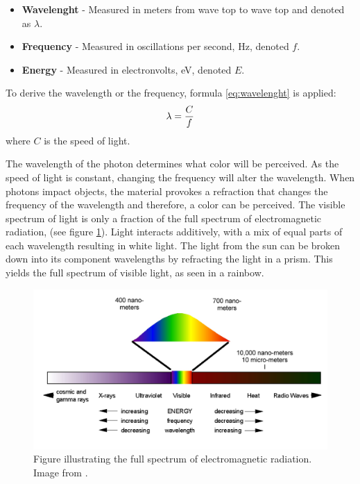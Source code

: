 \begin{itemize}
\item \textbf{Wavelenght} - Measured in meters from wave top to wave top and denoted as $\lambda$.
\item \textbf{Frequency} - Measured in oscillations per second, Hz, denoted $f$.
\item \textbf{Energy} - Measured in electronvolts, eV, denoted $E$.
\end{itemize}

To derive the wavelength or the frequency, formula \ref{eq:wavelenght} is applied:
\begin{align}
\centering 
\lambda = \frac{C}{f}
\label{eq:wavelenght} 
\end{align}
where {$C$} is the speed of light.

The wavelength of the photon determines what color will be perceived. As the speed of light is constant, changing the frequency will alter the wavelength. When photons impact objects, the material provokes a refraction that changes the frequency of the wavelength and therefore, a color can be perceived. The visible spectrum of light is only a fraction of the full spectrum of electromagnetic radiation, (see figure \ref{fig:em_rad}). Light interacts additively, with a mix of equal parts of each wavelength resulting in white light. The light from the sun can be broken down into its component wavelengths by refracting the light in a prism. This yields the full spectrum of visible light, as seen in a rainbow.

\begin{figure}[htbp] 
\centering 
\includegraphics[width=1\textwidth]{Pictures/Theory/em_rad.png} 
\caption{Figure illustrating the full spectrum of electromagnetic radiation. Image from \citep{em_spectrum}.} 
\label{fig:em_rad} 
\end{figure}

